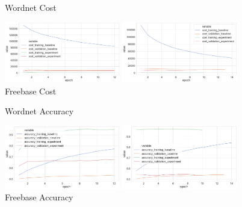 \begin{figure}[H]
	\parbox{.5\linewidth}{
   		\caption{Wordnet Cost}
   		\centering
    		\includegraphics[width=0.45\textwidth, height=0.2\textheight]{Wordnet_Cost_Results_Early_Stopping}
		}
	\hfill
	\parbox{.5\linewidth}{
		\caption{Freebase Cost}
   		\centering
		\includegraphics[width=0.45\textwidth, height=0.2\textheight]{Freebase_Cost_Results}
		}
\end{figure}

\begin{figure}[H]
	\parbox{.5\linewidth}{
   		\caption{Wordnet Accuracy}
   		\centering
    		\includegraphics[width=0.45\textwidth, height=0.2\textheight]{Wordnet_Accuracy_Results_Early_Stopping}
		}
	\hfill
	\parbox{.5\linewidth}{
		\caption{Freebase Accuracy}
   		\centering
		\includegraphics[width=0.45\textwidth, height=0.2\textheight]{Freebase_Accuracy_Results}
		}
\end{figure}

